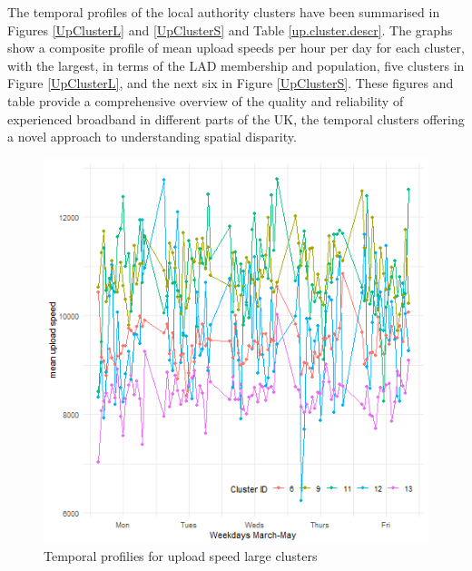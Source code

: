 \documentclass[Royal,times,sageh]{sagej}
\begin{document}
The temporal profiles of the local authority clusters have been
summarised in Figures \ref{UpClusterL} and \ref{UpClusterS} and Table
\ref{up.cluster.descr}. The graphs show a composite profile of mean
upload speeds per hour per day for each cluster, with the largest, in
terms of the LAD membership and population, five clusters in Figure
\ref{UpClusterL}, and the next six in Figure \ref{UpClusterS}. These
figures and table provide a comprehensive overview of the quality and
reliability of experienced broadband in different parts of the UK, the
temporal clusters offering a novel approach to understanding spatial
disparity.

\begin{figure}
\includegraphics[width=0.95\linewidth]{figures/upClusterL} \caption{\label{UpClusterL}Temporal profilies for upload speed large clusters}\label{fig:unnamed-chunk-2}
\end{figure}
\end{document}
